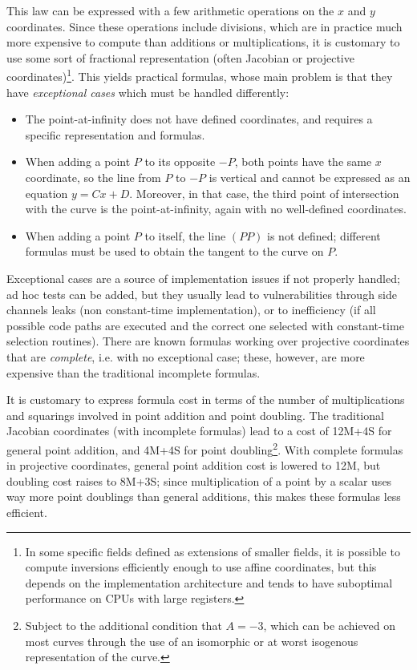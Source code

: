 \documentclass{llncs}
\begin{document}
This law can be expressed with a few arithmetic operations on the $x$
and $y$ coordinates. Since these operations include divisions, which are
in practice much more expensive to compute than additions or
multiplications, it is customary to use some sort of fractional
representation (often Jacobian or projective coordinates)\footnote{In
some specific fields defined as extensions of smaller fields, it is
possible to compute inversions efficiently enough to use affine
coordinates, but this depends on the implementation architecture and
tends to have suboptimal performance on CPUs with large
registers\cite{Por2020-1}.}. This yields practical formulas, whose main
problem is that they have \emph{exceptional cases} which must be handled
differently:
\begin{itemize}
    \item The point-at-infinity does not have defined coordinates, and
    requires a specific representation and formulas.

    \item When adding a point $P$ to its opposite $-P$, both points have
    the same $x$ coordinate, so the line from $P$ to $-P$ is vertical
    and cannot be expressed as an equation $y = Cx + D$. Moreover, in
    that case, the third point of intersection with the curve is the
    point-at-infinity, again with no well-defined coordinates.

    \item When adding a point $P$ to itself, the line $(PP)$ is not
    defined; different formulas must be used to obtain the tangent
    to the curve on $P$.
\end{itemize}

Exceptional cases are a source of implementation issues if not properly
handled; ad hoc tests can be added, but they usually lead to
vulnerabilities through side channels leaks (non constant-time
implementation), or to inefficiency (if all possible code paths are
executed and the correct one selected with constant-time selection
routines). There are known formulas working over projective coordinates
that are \emph{complete}, i.e. with no exceptional
case\cite{RenCosBat2015}; these, however, are more expensive than the
traditional incomplete formulas.

It is customary to express formula cost in terms of the number of
multiplications and squarings involved in point addition and point
doubling. The traditional Jacobian coordinates (with incomplete
formulas) lead to a cost of 12M+4S for general point addition, and 4M+4S
for point doubling\footnote{Subject to the additional condition that
$A = -3$, which can be achieved on most curves through the use of an
isomorphic or at worst isogenous representation of the curve.}. With
complete formulas in projective coordinates, general point addition cost
is lowered to 12M, but doubling cost raises to 8M+3S; since
multiplication of a point by a scalar uses way more point doublings than
general additions, this makes these formulas less efficient.
\end{document}
